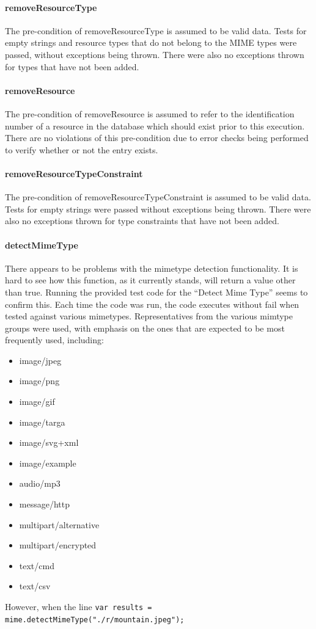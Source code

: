 \documentclass[a4paper]{article}
\begin{document}
\paragraph{removeResourceType}
The pre-condition of removeResourceType is assumed to be valid data. Tests for empty strings and resource types that do not belong to the MIME types were passed, without exceptions being thrown. There were also no exceptions thrown for types that have not been added.

\paragraph{removeResource}
The pre-condition of removeResource is assumed to refer to the identification number of a resource in the database which should exist prior to this execution. There are no violations of this pre-condition due to error checks being performed to verify whether or not the entry exists.

\paragraph{removeResourceTypeConstraint}
The pre-condition of removeResourceTypeConstraint is assumed to be valid data. Tests for empty strings were passed without exceptions being thrown. There were also no exceptions thrown for type constraints that have not been added.

\paragraph{detectMimeType} 
There appears to be problems with the mimetype detection functionality. It is hard to see how this function, as it currently stands, will return a value other than true. Running the provided test code for the “Detect Mime Type” seems to confirm this. Each time the code was run, the code executes without fail when tested against various mimetypes. Representatives from the various mimtype groups were used, with emphasis on the ones that are expected to be most frequently used, including:
\begin{itemize}
\item image/jpeg
\item image/png
\item image/gif
\item image/targa
\item image/svg+xml
\item image/example
\item audio/mp3
\item message/http
\item multipart/alternative
\item multipart/encrypted
\item text/cmd
\item text/csv
\end{itemize}
However, when the line \texttt{var results = mime.detectMimeType("./r/mountain.jpeg");} 
\end{document}

